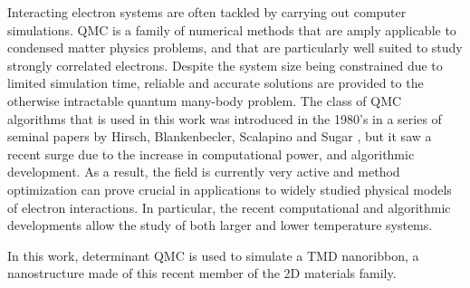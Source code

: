 Interacting electron systems are often tackled by carrying out computer simulations.
\ac{QMC} is a family of numerical methods that are  amply applicable to condensed matter physics problems, and that are particularly well suited to study strongly correlated electrons.
Despite the system size being constrained due to limited simulation time, reliable and accurate solutions are provided to the otherwise intractable quantum many-body problem.
The class of \acs{QMC} algorithms that is used in this work was introduced in the 1980's in a series of seminal papers by Hirsch, Blankenbecler, Scalapino and Sugar \cite{hirsch_discrete_1983, hirsch_monte_1982, blankenbecler_monte_1981, hirsch_two-dimensional_1985, hirsch_monte_1983, hirsch_stable_1988, hirsch_antiferromagnetism_1989}, but it saw a recent surge \cite{dumitrescu_superconductivity_2016, berg_monte_2018, beyl_revisiting_2018, chang_recent_2015, esterlis_breakdown_2018, mondaini_determinant_2012, meng_characterization_2014, kung_characterizing_2016, johnston_determinant_2013, rademaker_determinant_2013, ying_determinant_2014, scalettar_numerical_2007, zhou_quantum_2014} due to the increase in computational power, and algorithmic development.
As a result, the field is currently very active and method optimization can prove crucial in applications to widely studied physical models of electron interactions.
In particular, the recent computational and algorithmic developments allow the study of both larger and lower temperature systems.

In this work, determinant \acs{QMC} is used to simulate a \ac{TMD} nanoribbon, a nanostructure made of this recent member of the \acs{2D} materials family.